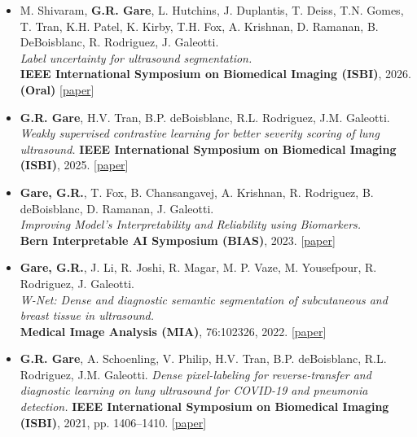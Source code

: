 \documentclass[10pt,a4paper,ragged2e,withhyper]{altacv}
\newcommand{\publink}[2]{{\small[\href{#1}{#2}]}}
\renewcommand{\cvsection}[2][]{\needspace{6\baselineskip}\origcvsection[#1]{#2}}
\begin{document}
\begin{itemize}
\item M. Shivaram, \textbf{G.R. Gare}, L. Hutchins, J. Duplantis, T. Deiss, T.N. Gomes, T. Tran, K.H. Patel, K. Kirby, T.H. Fox, A. Krishnan, D. Ramanan, B. DeBoisblanc, R. Rodriguez, J. Galeotti.\\
\emph{Label uncertainty for ultrasound segmentation.}\\
\textbf{IEEE International Symposium on Biomedical Imaging (ISBI)}, 2026. \textbf{(Oral)}
\publink{https://arxiv.org/abs/2508.15635}{paper}
\divider

\item \textbf{G.R. Gare}, H.V. Tran, B.P. deBoisblanc, R.L. Rodriguez, J.M. Galeotti.
\emph{Weakly supervised contrastive learning for better severity scoring of lung ultrasound.}
\textbf{IEEE International Symposium on Biomedical Imaging (ISBI)}, 2025.
\publink{https://arxiv.org/abs/2201.07357}{paper}
\divider

\item \textbf{Gare, G.R.}, T. Fox, B. Chansangavej, A. Krishnan, R. Rodriguez, B. deBoisblanc, D. Ramanan, J. Galeotti.\\
\emph{Improving Model’s Interpretability and Reliability using Biomarkers.}\\
\textbf{Bern Interpretable AI Symposium (BIAS)}, 2023.
\publink{https://arxiv.org/abs/2402.12394}{paper}
\divider

\item \textbf{Gare, G.R.}, J. Li, R. Joshi, R. Magar, M. P. Vaze, M. Yousefpour, R. Rodriguez, J. Galeotti.\\
\emph{W-Net: Dense and diagnostic semantic segmentation of subcutaneous and breast tissue in ultrasound.}\\
\textbf{Medical Image Analysis (MIA)}, 76:102326, 2022.
\publink{https://doi.org/10.1016/j.media.2021.102326}{paper}
\divider

\item \textbf{G.R. Gare}, A. Schoenling, V. Philip, H.V. Tran, B.P. deBoisblanc, R.L. Rodriguez, J.M. Galeotti.
\emph{Dense pixel-labeling for reverse-transfer and diagnostic learning on lung ultrasound for COVID-19 and pneumonia detection.}
\textbf{IEEE International Symposium on Biomedical Imaging (ISBI)}, 2021, pp. 1406–1410.
\publink{https://ieeexplore.ieee.org/document/9433826}{paper}
\divider
\end{itemize}

\vspace{-0.5em}
\cvsection{Professional Experience}
\end{document}

